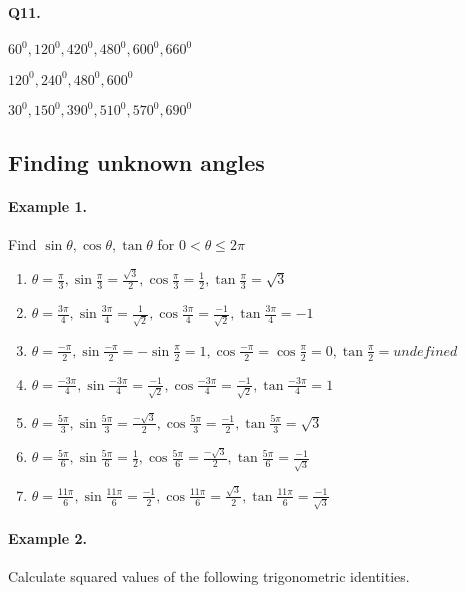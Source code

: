 \documentclass{article}
\begin{document}
\paragraph{Q11.}
\begin{enumerate*}[label=\alph*)]
          \item $60^{0}, 120^{0}, 420^{0}, 480^{0}, 600^{0}, 660^{0}$
          \item $120^{0}, 240^{0}, 480^{0}, 600^{0}$
          \item $30^{0}, 150^{0}, 390^{0}, 510^{0}, 570^{0}, 690^{0}$
\end{enumerate*}

\subsection {Finding unknown angles}
\paragraph{Example 1.}
Find $\sin\theta, \cos\theta, \tan\theta$ for $0<\theta\leq2\pi$

\begin{enumerate}[label=\alph*)]
  \item $\theta = \frac{\pi}{3}, \sin\frac{\pi}{3}=\frac{\sqrt{3}}{2}, \cos\frac{\pi}{3}=\frac{1}{2}, \tan\frac{\pi}{3}=\sqrt{3}$
  \item $\theta = \frac{3\pi}{4}, \sin\frac{3\pi}{4}=\frac{1}{\sqrt{2}}, \cos\frac{3\pi}{4}=\frac{-1}{\sqrt{2}}, \tan\frac{3\pi}{4}=-1$
  \item $\theta = \frac{-\pi}{2}, \sin\frac{-\pi}{2}=-\sin\frac{\pi}{2}=1, \cos\frac{-\pi}{2}=\cos\frac{\pi}{2}=0, \tan\frac{\pi}{2}=undefined$
  \item $\theta = \frac{-3\pi}{4}, \sin\frac{-3\pi}{4}=\frac{-1}{\sqrt{2}}, \cos\frac{-3\pi}{4}=\frac{-1}{\sqrt{2}}, \tan\frac{-3\pi}{4}=1$
  \item $\theta = \frac{5\pi}{3}, \sin\frac{5\pi}{3}=\frac{-\sqrt{3}}{2}, \cos\frac{5\pi}{3}=\frac{-1}{2}, \tan\frac{5\pi}{3}=\sqrt{3}$
  \item $\theta = \frac{5\pi}{6}, \sin\frac{5\pi}{6}=\frac{1}{2}, \cos\frac{5\pi}{6}=\frac{-\sqrt{3}}{2}, \tan\frac{5\pi}{6}=\frac{-1}{\sqrt{3}}$
  \item $\theta = \frac{11\pi}{6}, \sin\frac{11\pi}{6}=\frac{-1}{2}, \cos\frac{11\pi}{6}=\frac{\sqrt{3}}{2}, \tan\frac{11\pi}{6}=\frac{-1}{\sqrt{3}}$
\end{enumerate}

\paragraph{Example 2.}
Calculate squared values of the following trigonometric identities.
\end{document}
